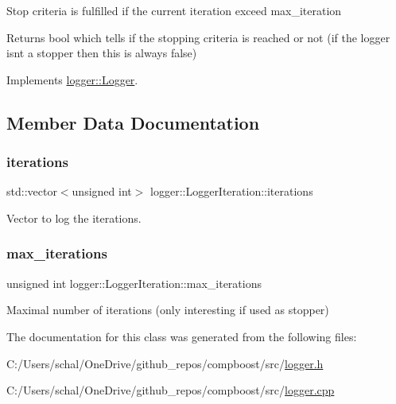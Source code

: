 Stop criteria is fulfilled if the current iteration exceed {\ttfamily max\+\_\+iteration} 

\begin{DoxyReturn}{Returns}
{\ttfamily bool} which tells if the stopping criteria is reached or not (if the logger isn\textquotesingle{}t a stopper then this is always false) 
\end{DoxyReturn}


Implements \mbox{\hyperlink{classlogger_1_1_logger_aed91421c07062b91cee158ef2bda7ae8}{logger\+::\+Logger}}.



\subsection{Member Data Documentation}
\mbox{\label{classlogger_1_1_logger_iteration_a3879ea4e72c8626df033b5345e392fd9}} 
\subsubsection{\texorpdfstring{iterations}{iterations}}
{\footnotesize\ttfamily std\+::vector$<$unsigned int$>$ logger\+::\+Logger\+Iteration\+::iterations\hspace{0.3cm}{\ttfamily [private]}}



Vector to log the iterations. 

\mbox{\label{classlogger_1_1_logger_iteration_a30cfbf3c8c363807826b754f19195c44}} 
\subsubsection{\texorpdfstring{max\+\_\+iterations}{max\_iterations}}
{\footnotesize\ttfamily unsigned int logger\+::\+Logger\+Iteration\+::max\+\_\+iterations\hspace{0.3cm}{\ttfamily [private]}}



Maximal number of iterations (only interesting if used as stopper) 



The documentation for this class was generated from the following files\+:\begin{DoxyCompactItemize}
\item 
C\+:/\+Users/schal/\+One\+Drive/github\+\_\+repos/compboost/src/\mbox{\hyperlink{logger_8h}{logger.\+h}}\item 
C\+:/\+Users/schal/\+One\+Drive/github\+\_\+repos/compboost/src/\mbox{\hyperlink{logger_8cpp}{logger.\+cpp}}\end{DoxyCompactItemize}
